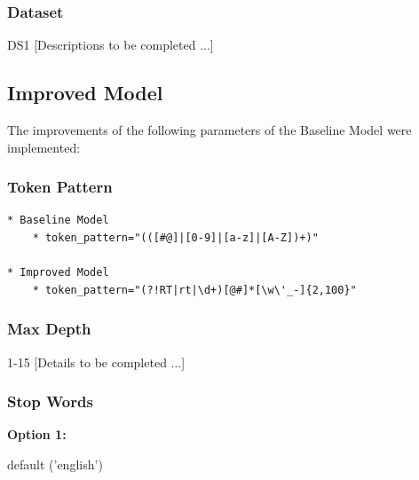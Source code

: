\documentclass{article} %
\begin{document}
\subsubsection{Dataset}

DS1 [Descriptions to be completed ...]

\subsection{Improved Model}

The improvements of the following parameters of the Baseline Model were implemented:


\subsubsection{Token Pattern}

\lstset{language=Python}
\lstset{frame=lines}
\lstset{basicstyle=\footnotesize}
\begin{lstlisting}
* Baseline Model
	* token_pattern="(([#@]|[0-9]|[a-z]|[A-Z])+)"
	
* Improved Model
	* token_pattern="(?!RT|rt|\d+)[@#]*[\w\'_-]{2,100}"
\end{lstlisting}

\subsubsection{Max Depth}

1-15 [Details to be completed ...]

\subsubsection{Stop Words}

\textbf{Option 1:}

default ('english')
\end{document}
